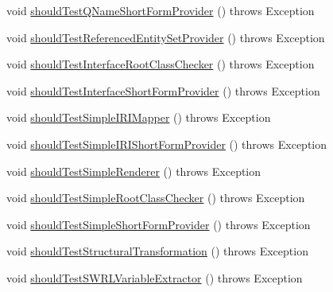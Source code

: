\begin{DoxyCompactItemize}
\item 
void \hyperlink{classorg_1_1semanticweb_1_1owlapi_1_1contract_1_1_contract_owlapi_util_test_ac87360e664392acab5f34339364cb391}{should\-Test\-Q\-Name\-Short\-Form\-Provider} ()  throws Exception 
\item 
void \hyperlink{classorg_1_1semanticweb_1_1owlapi_1_1contract_1_1_contract_owlapi_util_test_ad122883414a4dee5a56f7f50694c16f1}{should\-Test\-Referenced\-Entity\-Set\-Provider} ()  throws Exception 
\item 
void \hyperlink{classorg_1_1semanticweb_1_1owlapi_1_1contract_1_1_contract_owlapi_util_test_a9d36e877a016992e117b4c13398a4b2e}{should\-Test\-Interface\-Root\-Class\-Checker} ()  throws Exception 
\item 
void \hyperlink{classorg_1_1semanticweb_1_1owlapi_1_1contract_1_1_contract_owlapi_util_test_a6432d6ecb7508dc54c1d5709a8fec0a7}{should\-Test\-Interface\-Short\-Form\-Provider} ()  throws Exception 
\item 
void \hyperlink{classorg_1_1semanticweb_1_1owlapi_1_1contract_1_1_contract_owlapi_util_test_a4e548c9e274df9d77edf4ca3290c6ebd}{should\-Test\-Simple\-I\-R\-I\-Mapper} ()  throws Exception 
\item 
void \hyperlink{classorg_1_1semanticweb_1_1owlapi_1_1contract_1_1_contract_owlapi_util_test_a03066e52554ee3eb68b258ed8818b279}{should\-Test\-Simple\-I\-R\-I\-Short\-Form\-Provider} ()  throws Exception 
\item 
void \hyperlink{classorg_1_1semanticweb_1_1owlapi_1_1contract_1_1_contract_owlapi_util_test_a9ba43b8189fc219fde4e053bc8eb6b14}{should\-Test\-Simple\-Renderer} ()  throws Exception 
\item 
void \hyperlink{classorg_1_1semanticweb_1_1owlapi_1_1contract_1_1_contract_owlapi_util_test_ab6eed4b0172b169ef9b6dc9a3ef15915}{should\-Test\-Simple\-Root\-Class\-Checker} ()  throws Exception 
\item 
void \hyperlink{classorg_1_1semanticweb_1_1owlapi_1_1contract_1_1_contract_owlapi_util_test_a512b956e56d1ee82a93a88975d04039b}{should\-Test\-Simple\-Short\-Form\-Provider} ()  throws Exception 
\item 
void \hyperlink{classorg_1_1semanticweb_1_1owlapi_1_1contract_1_1_contract_owlapi_util_test_a2bd7f452831738cb664f6afa0010c978}{should\-Test\-Structural\-Transformation} ()  throws Exception 
\item 
void \hyperlink{classorg_1_1semanticweb_1_1owlapi_1_1contract_1_1_contract_owlapi_util_test_a62acaa63fd560e658e2dfd153bba4978}{should\-Test\-S\-W\-R\-L\-Variable\-Extractor} ()  throws Exception 

\end{DoxyCompactItemize}
